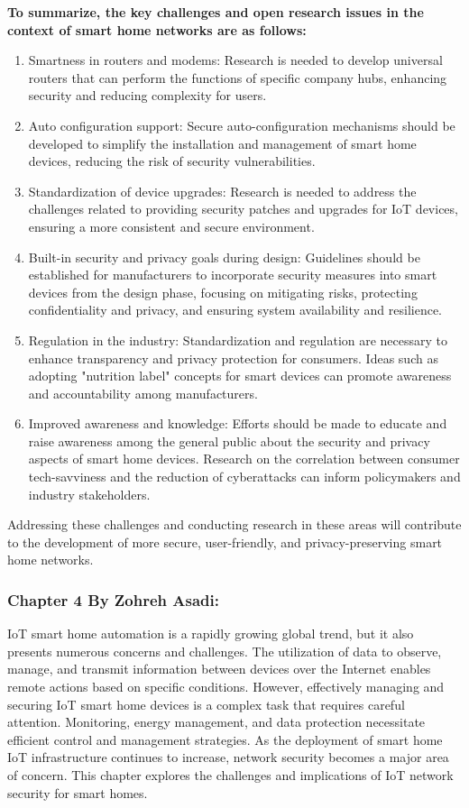 \textbf{To summarize, the key challenges and open research issues in the context of smart home networks are as follows:}

\begin{enumerate}
    \item Smartness in routers and modems: Research is needed to develop universal routers that can perform the functions of specific company hubs, enhancing security and reducing complexity for users.
    \item Auto configuration support: Secure auto-configuration mechanisms should be developed to simplify the installation and management of smart home devices, reducing the risk of security vulnerabilities.
    \item Standardization of device upgrades: Research is needed to address the challenges related to providing security patches and upgrades for IoT devices, ensuring a more consistent and secure environment.
    \item Built-in security and privacy goals during design: Guidelines should be established for manufacturers to incorporate security measures into smart devices from the design phase, focusing on mitigating risks, protecting confidentiality and privacy, and ensuring system availability and resilience.
    \item Regulation in the industry: Standardization and regulation are necessary to enhance transparency and privacy protection for consumers. Ideas such as adopting "nutrition label" concepts for smart devices can promote awareness and accountability among manufacturers.
    \item Improved awareness and knowledge: Efforts should be made to educate and raise awareness among the general public about the security and privacy aspects of smart home devices. Research on the correlation between consumer tech-savviness and the reduction of cyberattacks can inform policymakers and industry stakeholders.
\end{enumerate}
Addressing these challenges and conducting research in these areas will contribute to the development of more secure, user-friendly, and privacy-preserving smart home networks.

\newpage
\subsubsection{Chapter 4 By Zohreh Asadi:}

IoT smart home automation is a rapidly growing global trend, but it also presents numerous concerns and challenges. The utilization of data to observe, manage, and transmit information between devices over the Internet enables remote actions based on specific conditions. However, effectively managing and securing IoT smart home devices is a complex task that requires careful attention. Monitoring, energy management, and data protection necessitate efficient control and management strategies. As the deployment of smart home IoT infrastructure continues to increase, network security becomes a major area of concern. This chapter explores the challenges and implications of IoT network security for smart homes.

